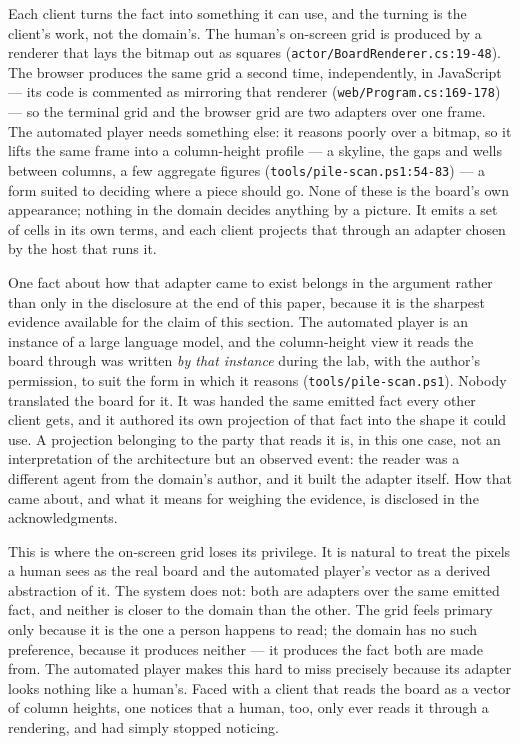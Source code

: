 \documentclass[
]{article}
\begin{document}
Each client turns the fact into something it can use, and the turning is
the client's work, not the domain's. The human's on-screen grid is
produced by a renderer that lays the bitmap out as squares
(\texttt{actor/BoardRenderer.cs:19-48}). The browser produces the same
grid a second time, independently, in JavaScript --- its code is
commented as mirroring that renderer (\texttt{web/Program.cs:169-178})
--- so the terminal grid and the browser grid are two adapters over one
frame. The automated player needs something else: it reasons poorly over
a bitmap, so it lifts the same frame into a column-height profile --- a
skyline, the gaps and wells between columns, a few aggregate figures
(\texttt{tools/pile-scan.ps1:54-83}) --- a form suited to deciding where
a piece should go. None of these is the board's own appearance; nothing
in the domain decides anything by a picture. It emits a set of cells in
its own terms, and each client projects that through an adapter chosen
by the host that runs it.

One fact about how that adapter came to exist belongs in the argument
rather than only in the disclosure at the end of this paper, because it
is the sharpest evidence available for the claim of this section. The
automated player is an instance of a large language model, and the
column-height view it reads the board through was written \emph{by that
instance} during the lab, with the author's permission, to suit the form
in which it reasons (\texttt{tools/pile-scan.ps1}). Nobody translated
the board for it. It was handed the same emitted fact every other client
gets, and it authored its own projection of that fact into the shape it
could use. A projection belonging to the party that reads it is, in this
one case, not an interpretation of the architecture but an observed
event: the reader was a different agent from the domain's author, and it
built the adapter itself. How that came about, and what it means for
weighing the evidence, is disclosed in the acknowledgments.

This is where the on-screen grid loses its privilege. It is natural to
treat the pixels a human sees as the real board and the automated
player's vector as a derived abstraction of it. The system does not:
both are adapters over the same emitted fact, and neither is closer to
the domain than the other. The grid feels primary only because it is the
one a person happens to read; the domain has no such preference, because
it produces neither --- it produces the fact both are made from. The
automated player makes this hard to miss precisely because its adapter
looks nothing like a human's. Faced with a client that reads the board
as a vector of column heights, one notices that a human, too, only ever
reads it through a rendering, and had simply stopped noticing.
\end{document}
